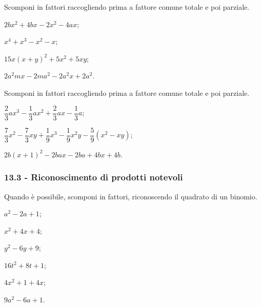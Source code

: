 \begin{esercizio}
\label{ese:13.33}
Scomponi in fattori raccogliendo prima a fattore comune totale e poi parziale.
\begin{multicols}{2}
\begin{enumeratea}
 \item $2bx^{2}+4bx-2x^{2}-4ax$;
 \item $x^{4}+x^{3}-x^{2}-x$;
 \item $15x(x+y)^{2}+5x^{2}+5xy$;
 \item $2a^{2}mx-2ma^{2}-2a^{2}x+2a^{2}$.
\end{enumeratea}
\end{multicols}
\end{esercizio}

\begin{esercizio}[\Ast]
\label{ese:13.34}
Scomponi in fattori raccogliendo prima a fattore comune totale e poi parziale.
\begin{enumeratea}
 \item $\dfrac{2}{3}ax^{3}-\dfrac{1}{3}ax^{2}+\dfrac{2}{3}ax-\dfrac{1}{3}a$;
 \item $\dfrac{7}{3}x^{2}-\dfrac{7}{3}xy+\dfrac{1}{9}x^{3}-\dfrac{1}{9}x^{2}y-\dfrac{5}{9}(x^{2}-xy)$;
 \item $2b(x+1)^{2}-2bax-2ba+4bx+4b$.
\end{enumeratea}
\end{esercizio}
\pagebreak
\subsubsection*{13.3 - Riconoscimento di prodotti notevoli}
\begin{esercizio}
\label{ese:13.35}
Quando è possibile, scomponi in fattori, riconoscendo il quadrato di un binomio.
\begin{multicols}{3}
\begin{enumeratea}
 \item $a^{2}-2a+1$;
 \item $x^{2}+4x+4$;
 \item $y^{2}-6y+9$;
 \item $16t^{2}+8t+1$;
 \item $4x^{2}+1+4x$;
 \item $9a^{2}-6a+1$.
\end{enumeratea}
\end{multicols}
\end{esercizio}

